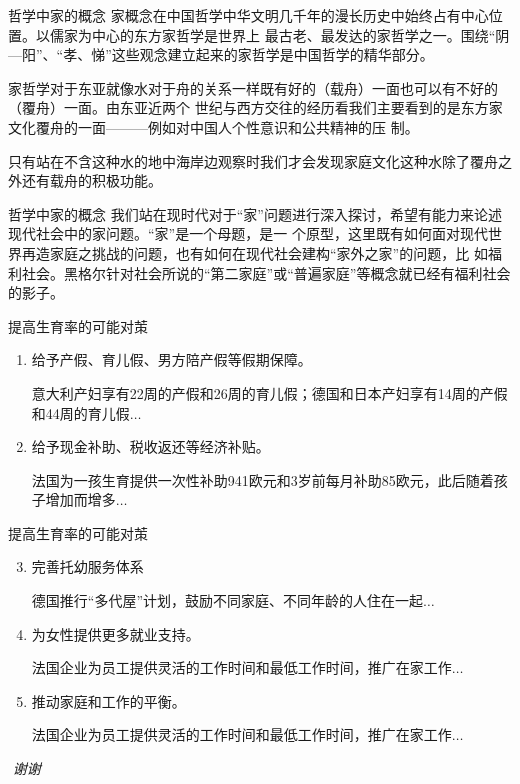 \documentclass[presentation]{beamer}
\begin{document}
\begin{frame}[label={sec:org7999fb4}]{哲学中家的概念}
家概念在中国哲学中华文明几千年的漫长历史中始终占有中心位置。以儒家为中心的东方家哲学是世界上
最古老、最发达的家哲学之一。围绕“阴—阳”、“孝、悌”这些观念建立起来的家哲学是中国哲学的精华部分。\pause

家哲学对于东亚就像水对于舟的关系一样既有好的（载舟）一面也可以有不好的（覆舟）一面。由东亚近两个
世纪与西方交往的经历看我们主要看到的是东方家文化覆舟的一面———例如对中国人个性意识和公共精神的压
制。\pause

只有站在不含这种水的地中海岸边观察时我们才会发现家庭文化这种水除了覆舟之外还有载舟的积极功能。
\end{frame}
\begin{frame}[label={sec:orge5231f5}]{哲学中家的概念}
我们站在现时代对于“家”问题进行深入探讨，希望有能力来论述现代社会中的家问题。“家”是一个母题，是一
个原型，这里既有如何面对现代世界再造家庭之挑战的问题，也有如何在现代社会建构“家外之家”的问题，比
如福利社会。黑格尔针对社会所说的“第二家庭”或“普遍家庭”等概念就已经有福利社会的影子。\pause
\end{frame}


\begin{frame}[label={sec:orgdd8fcd6}]{提高生育率的可能对茦}
\begin{enumerate}
\item 给予产假、育儿假、男方陪产假等假期保障。

意大利产妇享有22周的产假和26周的育儿假；德国和日本产妇享有14周的产假和44周的育儿假\(\dots\)
\item 给予现金补助、税收返还等经济补贴。

法国为一孩生育提供一次性补助941欧元和3岁前每月补助85欧元，此后随着孩子增加而增多\(\dots\)
\end{enumerate}
\end{frame}

\begin{frame}[label={sec:org4cadc1f}]{提高生育率的可能对茦}
\begin{enumerate}
\setcounter{enumi}{2}
\item 完善托幼服务体系

德国推行“多代屋”计划，鼓励不同家庭、不同年龄的人住在一起\(\dots\)
\item 为女性提供更多就业支持。

法国企业为员工提供灵活的工作时间和最低工作时间，推广在家工作\(\dots\)
\item 推动家庭和工作的平衡。

法国企业为员工提供灵活的工作时间和最低工作时间，推广在家工作\(\dots\)
\end{enumerate}
\end{frame}

\begin{frame}[label={sec:org397793f}]{​}
  \centering \Large
\emph{谢谢}
\end{frame}
\end{document}
